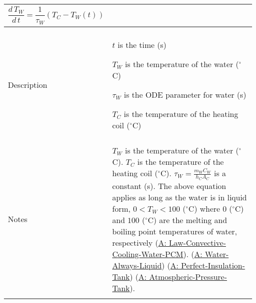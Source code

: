 \documentclass[12pt]{article}
\begin{document}
\begin{minipage}{\textwidth}
\begin{tabular}{p{} p{}}
\begin{displaymath}
                                                                             \frac{d\,{T_{W}}}{d\,t}=\frac{1}{{τ_{W}}} \left({T_{C}}-{T_{W}}\left(t\right)\right)
                                                                             \end{displaymath}
                                                                             \\ \midrule \\
                                                                             Description & \begin{symbDescription}
                                                                                           \item{$t$ is the time (s)}
                                                                                           \item{${T_{W}}$ is the temperature of the water (${}^{\circ}$C)}
                                                                                           \item{${τ_{W}}$ is the ODE parameter for water (s)}
                                                                                           \item{${T_{C}}$ is the temperature of the heating coil (${}^{\circ}$C)}
                                                                                           \end{symbDescription}
                                                                                           \\ \midrule \\
                                                                                           Notes & ${T_{W}}$ is the temperature of the water (${}^{\circ}$C). ${T_{C}}$ is the temperature of the heating coil (${}^{\circ}$C). ${τ_{W}}=\frac{{m_{W}} {C_{W}}}{{h_{C}} {A_{C}}}$ is a constant (s). The above equation applies as long as the water is in liquid form, $0<{T_{W}}<100$ (${}^{\circ}$C) where $0$ (${}^{\circ}$C) and $100$ (${}^{\circ}$C) are the melting and boiling point temperatures of water, respectively (\hyperref[A:Law-Convective-Cooling-Water-PCM]{A: Law-Convective-Cooling-Water-PCM}). (\hyperref[A:Water-Always-Liquid]{A: Water-Always-Liquid}) (\hyperref[A:Perfect-Insulation-Tank]{A: Perfect-Insulation-Tank}) (\hyperref[A:Atmospheric-Pressure-Tank]{A: Atmospheric-Pressure-Tank}).
                                                                                                   \\ \midrule \\

\end{tabular}
\end{minipage}
\end{document}
